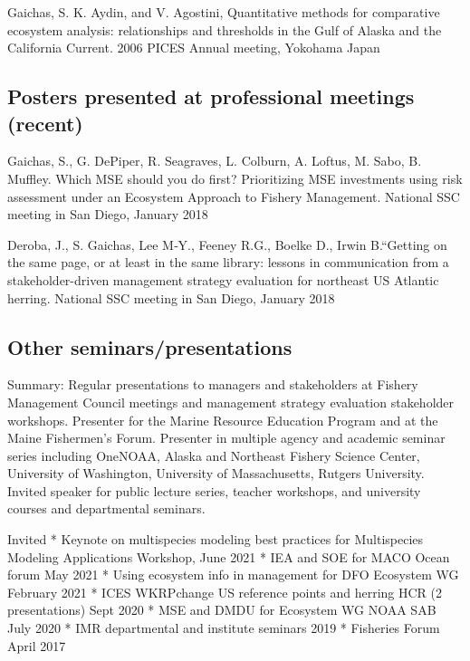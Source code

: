 \documentclass[11pt, a4paper]{awesome-cv}
\begin{document}
Gaichas, S. K. Aydin, and V. Agostini, Quantitative methods for
comparative ecosystem analysis: relationships and thresholds in the Gulf
of Alaska and the California Current. 2006 PICES Annual meeting,
Yokohama Japan

\hypertarget{posters-presented-at-professional-meetings-recent}{%
\subsection{Posters presented at professional meetings
(recent)}\label{posters-presented-at-professional-meetings-recent}}

Gaichas, S., G. DePiper, R. Seagraves, L. Colburn, A. Loftus, M. Sabo,
B. Muffley. Which MSE should you do first? Prioritizing MSE investments
using risk assessment under an Ecosystem Approach to Fishery Management.
National SSC meeting in San Diego, January 2018

Deroba, J., S. Gaichas, Lee M‐Y., Feeney R.G., Boelke D., Irwin
B.``Getting on the same page, or at least in the same library: lessons
in communication from a stakeholder-driven management strategy
evaluation for northeast US Atlantic herring. National SSC meeting in
San Diego, January 2018

\hypertarget{other-seminarspresentations}{%
\subsection{Other
seminars/presentations}\label{other-seminarspresentations}}

Summary: Regular presentations to managers and stakeholders at Fishery
Management Council meetings and management strategy evaluation
stakeholder workshops. Presenter for the Marine Resource Education
Program and at the Maine Fishermen's Forum. Presenter in multiple agency
and academic seminar series including OneNOAA, Alaska and Northeast
Fishery Science Center, University of Washington, University of
Massachusetts, Rutgers University. Invited speaker for public lecture
series, teacher workshops, and university courses and departmental
seminars.

Invited * Keynote on multispecies modeling best practices for
Multispecies Modeling Applications Workshop, June 2021 * IEA and SOE for
MACO Ocean forum May 2021 * Using ecosystem info in management for DFO
Ecosystem WG February 2021 * ICES WKRPchange US reference points and
herring HCR (2 presentations) Sept 2020 * MSE and DMDU for Ecosystem WG
NOAA SAB July 2020 * IMR departmental and institute seminars 2019 *
Fisheries Forum April 2017
\end{document}
